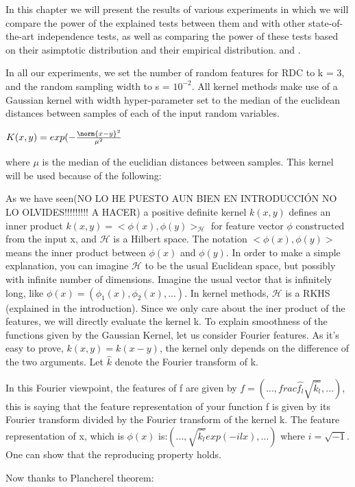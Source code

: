 In this chapter we will present the results of various experiments in which we will compare the power of the explained tests between them and with other state-of-the-art independence tests, as well as comparing the power of these tests based on their asimptotic distribution and their empirical distribution. and \cite{HSICdistribution}.

In all our experiments, we set the number of random features for RDC to k = 3, and the random sampling width to s = $10^{-2}$. All kernel methods make use of a Gaussian kernel with width hyper-parameter set to the median of the euclidean distances between samples of each of the input random variables.

$K(x,y) = exp(-\frac{\norm{x-y}^{2}}{\mu^{2}}$

where $\mu$ is the median of the euclidian distances between samples.
This kernel will be used because of the following:

As we have seen(NO LO HE PUESTO AUN BIEN EN INTRODUCCIÓN NO LO OLVIDES!!!!!!!!! A HACER) a positive definite kernel $k(x,y)$ defines an inner product $k(x,y) = <\phi(x),\phi(y)>_{\mathcal{H}}$ for feature vector $\phi$ constructed from the input x, and $\mathcal{H}$ is a Hilbert space. The notation $<\phi(x),\phi(y)>$ means the inner product between $\phi(x)$ and $\phi(y)$. In order to make a simple explanation, you can imagine $\mathcal{H}$ to be the usual Euclidean space, but possibly with infinite number of dimensions. Imagine the usual vector that is infinitely long, like $\phi(x) = (\phi_{1}(x),\phi_{2}(x),...)$. In kernel methods, $\mathcal{H}$ is a RKHS (explained in the introduction). Since we only care about the iner product of the features, we will directly evaluate the kernel k.
To explain smoothness of the functions given by the Gaussian Kernel, let us consider Fourier features. As it's easy to prove, $k(x,y)=k(x-y)$, the kernel only depends on the difference of the two arguments. Let $\hat{k}$ denote the Fourier transform of k.

In this Fourier viewpoint, the features of f are given by $f = (...,frac{\hat{f_{l}}}{\sqrt{\hat{k_{l}}}},...)$, this is saying that the feature representation of your function f is given by its Fourier transform divided by the Fourier transform of the kernel k. The feature representation of x, which is $\phi(x)$ is:$(...,\sqrt{\hat{k_{l}}}exp(-ilx),...)$ where $i = \sqrt{-1}$. One can show that the reproducing property holds.

Now thanks to Plancherel theorem:

